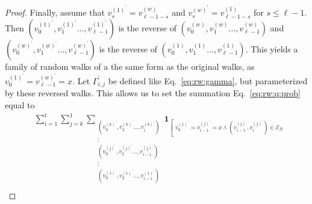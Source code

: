 \documentclass[10]{report}
\begin{document}
\begin{proof}
Finally, assume that $v^{(1)^\prime}_s = v^{(w)}_{\ell -1 - s}$ and $v^{(w)^\prime}_s = v^{(1)}_{\ell -1 - s}$ for $s \leq \ell-1$.
Then $\left ( v_0^{(1)^\prime}, v_1^{(1)^\prime} \dots, v_{\ell-1}^{(1)^\prime} \right )$ is the reverse of $\left ( v_0^{(w)}, v_{1}^{(w)} \dots, v_{\ell-1}^{(w)} \right )$ and $\left ( v_0^{(w)^\prime}, v_1^{(w)^\prime} \dots, v_{\ell-1}^{(w)^\prime} \right )$ is the reverse of $\left ( v_0^{(1)}, v_{1}^{(1)} \dots, v_{\ell-1}^{(1)} \right )$.
This yields a family of random walks of a the same form as the original walks, as $v_0^{(1)^\prime} = v_{\ell - 1}^{(w)^\prime} = x$.
Let $\Gamma_{i,j}^\prime$ be defined like Eq.~\ref{eq:rw:gamma}, but parameterized by these reversed walks.
This allows us to set the summation Eq.~\eqref{eq:rw:q:prob} equal to 
%
\begin{align}
\label{eq:rw:q:prob:reverse}
& 
\sum_{i = 1}^{t} 
\sum_{j =k}^{1} 
\sum_{\substack{
	\left (v_0^{(k)^\prime}, v_2^{(k)^\prime} \dots, v_i^{(k)^\prime} \right ) \\
	\vdots \\
	\left (v_0^{(j)^\prime}, v_2^{(j)^\prime} \dots, v_{i-1}^{(j)^\prime} \right ) \\
	\vdots \\
	\left (v_0^{(1)^\prime}, v_2^{(1)^\prime} \dots, v_{i-1}^{(1)^\prime} \right ) \\
}}
\mathbf{1}_{ \left [\substack{
	v_0^{(1)^\prime} = v_{i-1}^{(j)^\prime} = x 
			\wedge \left ( v_{i-1}^{(j)^\prime}, v_{i}^{(j)^\prime} \right ) \in \mathcal{E}_\mathcal{B} 
}}
\end{align}
\end{proof}
\end{document}
